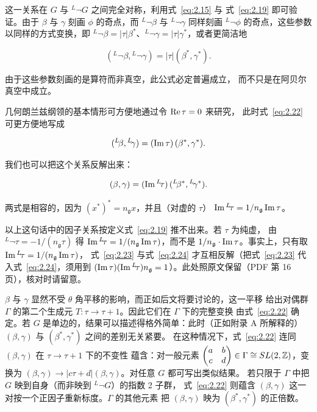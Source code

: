 这一关系在 $G$ 与 $^L\neg G$ 之间完全对称，利用式~\eqref{eq:2.15} 与
式~\eqref{eq:2.19} 即可验证。由于 $\beta$ 与 $\gamma$ 刻画 $\phi$ 的奇点，而 $^L\neg\beta$ 与
$^L\neg\gamma$ 同样刻画 ${}^L\neg\phi$ 的奇点，这些参数以同样的方式变换，即 $^L\neg\beta=|\tau|\beta^*$、$^L\neg\gamma=|\tau|\gamma^*$，或者更简洁地

\setcounter{equation}{21}
\begin{equation}\label{eq:2.22}
  ({}^L\neg\beta,{}^L\neg\gamma)=|\tau|(\beta^*,\gamma^*).
\end{equation}

由于这些参数刻画的是算符而非真空，此公式必定普遍成立，
而不只是在阿贝尔真空中成立。

几何朗兰兹纲领的基本情形可方便地通过令 ${\rm Re}\,\tau=0$ 来研究，
此时式~\eqref{eq:2.22} 可更方便地写成

\setcounter{equation}{22}
\begin{equation}\label{eq:2.23}
  ({}^L\neg\beta,{}^L\neg\gamma)=({\rm Im}\,\tau)\,(\beta^*,\gamma^*).
\end{equation}

我们也可以把这个关系反解出来：

\setcounter{equation}{23}
\begin{equation}\label{eq:2.24}
  (\beta,\gamma)=({\rm Im}\,^L\neg\tau)\,({}^L\neg\beta^*,{}^L\neg\gamma^*).
\end{equation}

两式是相容的，因为 $(x^*)^*=n_{\mathfrak g}x$，并且（对虚的 $\tau$）
${\rm Im}\,^L\neg\tau=1/n_{\mathfrak g}\,{\rm Im}\,\tau$。

\begin{yizhu}[原文疑误]以上这句话中的因子关系按定义式~\eqref{eq:2.19} 推不出来。若 $\tau$ 为纯虚，
由 ${}^L\neg\tau=-1/(n_{\mathfrak g}\tau)$ 得 ${\rm Im}\,{}^L\neg\tau=1/(n_{\mathfrak g}\,{\rm Im}\,\tau)$，而不是
$1/n_{\mathfrak g}\cdot{\rm Im}\,\tau$。事实上，只有取 ${\rm Im}\,{}^L\neg\tau=1/(n_{\mathfrak g}\,{\rm Im}\,\tau)$，
式~\eqref{eq:2.23} 与式~\eqref{eq:2.24} 才互相反解（把式~\eqref{eq:2.23} 代入式~\eqref{eq:2.24}，须用到
$({\rm Im}\,\tau)({\rm Im}\,{}^L\neg\tau)n_{\mathfrak g}=1$）。此处照原文保留（PDF 第 16 页），核对时请留意。\end{yizhu}

$\beta$ 与 $\gamma$ 显然不受 $\theta$ 角平移的影响，而正如后文将要讨论的，这一平移
给出对偶群 $\Gamma$ 的第二个生成元 $T:\tau\to\tau+1$。因此它们在 $\Gamma$ 下的完整变换
由式~\eqref{eq:2.22} 确定。若 $G$ 是单边的，结果可以描述得格外简单：此时（正如附录 A 所解释的）
$(\beta,\gamma)$ 与 $(\beta^*,\gamma^*)$ 之间的差别无关紧要。
在这种情况下，式~\eqref{eq:2.22} 连同 $(\beta,\gamma)$ 在 $\tau\to\tau+1$ 下的不变性
蕴含：对一般元素
$\left(\begin{matrix}a&b\\ c&d\end{matrix}\right)\in\Gamma\cong SL(2,\Z)$，变换为 $(\beta,\gamma)\to
|c\tau+d|(\beta,\gamma)$。对任意 $G$ 都可写出类似结果。
若只限于 $\Gamma$ 中把 $G$ 映到自身（而非映到 $^L\neg G$）的指数 2 子群，
式~\eqref{eq:2.22} 则蕴含 $(\beta,\gamma)$ 这一对按一个正因子重新标度。$\Gamma$ 的其他元素
把 $(\beta,\gamma)$ 映为 $(\beta^*,\gamma^*)$ 的正倍数。

